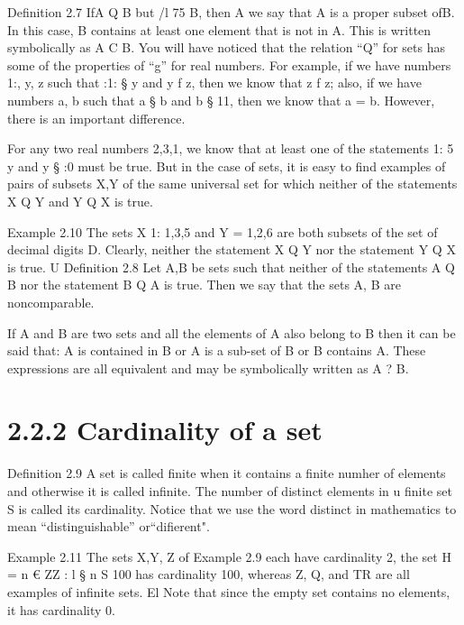 \documentclass{beamer}
\begin{document}
\begin{frame}
\begin{frame}
\begin{frame}
\begin{frame}
Deﬁnition 2.7 IfA Q B but /l 75 B, then A we say that A is a proper subset ofB. In this case,
B contains at least one element that is not in A. This is written symbolically as A C B.
You will have noticed that the relation “Q” for sets has some of the properties of “g” for real
numbers. For example, if we have numbers 1:, y, z such that :1: § y and y f z, then we know that
z f z; also, if we have numbers a, b such that a § b and b § 11, then we know that a = b. However,
there is an important difference. 
\end{frame}
\begin{frame}
For any two real numbers 2,3,1, we know that at least one of the
statements 1: 5 y and y § :0 must be true. But in the case of sets, it is easy to ﬁnd examples of
pairs of subsets X,Y of the same universal set for which neither of the statements X Q Y and
Y Q X is true.
\end{frame}
\begin{frame}
Example 2.10 The sets X 1: {1,3,5} and Y = {1,2,6} are both subsets of the set of decimal
digits D. Clearly, neither the statement X Q Y nor the statement Y Q X is true. U
Deﬁnition 2.8 Let A,B be sets such that neither of the statements A Q B nor the statement
B Q A is true. Then we say that the sets A, B are noncomparable.
\end{frame}
\begin{frame}

If A and B are two sets and all the elements of A also belong to B then it
can be said that:
A is contained in B
or A is a sub-set of B
or B contains A.
These expressions are all equivalent and may be symbolically written as
A ? B.
\end{frame}
\section{2.2.2 Cardinality of a set}
Deﬁnition 2.9 A set is called finite when it contains a finite numher of elements and otherwise
it is called inﬁnite. The number of distinct elements in u ﬁnite set S is called its cardinality.
Notice that we use the word distinct in mathematics to mean “distinguishable” or“diﬁerent".

\end{frame}
Example 2.11 The sets X,Y, Z of Example 2.9 each have cardinality 2, the set H = {n € ZZ : l §
n S 100} has cardinality 100, whereas Z, Q, and TR are all examples of inﬁnite sets. El
Note that since the empty set contains no elements, it has cardinality 0.

\end{frame}
\end{frame}
\end{document}
